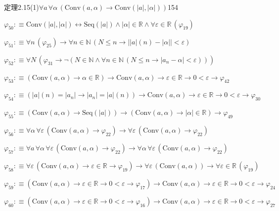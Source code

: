 \begin{fullproof}{定理2.15(1)}{$\forall a\,\forall \alpha\,(\mathrm{Conv}(a,\alpha) \to \mathrm{Conv}(\lvert a \rvert,\lvert \alpha \rvert))$}{154}
\begin{abbrevlist}
\item $\varphi_{50} :\equiv \mathrm{Conv}(\lvert a \rvert,\lvert \alpha \rvert) \leftrightarrow \mathrm{Seq}(\lvert a \rvert) \land \lvert \alpha \rvert \in \mathbb{R} \land \forall \varepsilon \in \mathbb{R}\,(\varphi_{19})$
\item $\varphi_{51} :\equiv \forall n\,(\varphi_{25}) \to \forall n \in \mathbb{N}\,(N \leq n \to \lvert \lvert a \rvert(n) - \lvert \alpha \rvert \rvert < \varepsilon)$
\item $\varphi_{52} :\equiv \forall N\,(\varphi_{31} \to \neg (N \in \mathbb{N} \land \forall n \in \mathbb{N}\,(N \leq n \to \lvert a_{n} - \alpha \rvert < \varepsilon)))$
\item $\varphi_{53} :\equiv (\mathrm{Conv}(a,\alpha) \to \alpha \in \mathbb{R}) \to \mathrm{Conv}(a,\alpha) \to \varepsilon \in \mathbb{R} \to 0 < \varepsilon \to \varphi_{42}$
\item $\varphi_{54} :\equiv (\lvert a \rvert(n) = \lvert a_{n} \rvert \to \lvert a_{n} \rvert = \lvert a \rvert(n)) \to \mathrm{Conv}(a,\alpha) \to \varepsilon \in \mathbb{R} \to 0 < \varepsilon \to \varphi_{30}$
\item $\varphi_{55} :\equiv (\mathrm{Conv}(a,\alpha) \to \mathrm{Seq}(\lvert a \rvert)) \to (\mathrm{Conv}(a,\alpha) \to \lvert \alpha \rvert \in \mathbb{R}) \to \varphi_{49}$
\item $\varphi_{56} :\equiv \forall \alpha\,\forall \varepsilon\,(\mathrm{Conv}(a,\alpha) \to \varphi_{22}) \to \forall \varepsilon\,(\mathrm{Conv}(a,\alpha) \to \varphi_{22})$
\item $\varphi_{57} :\equiv \forall a\,\forall \alpha\,\forall \varepsilon\,(\mathrm{Conv}(a,\alpha) \to \varphi_{22}) \to \forall \alpha\,\forall \varepsilon\,(\mathrm{Conv}(a,\alpha) \to \varphi_{22})$
\item $\varphi_{58} :\equiv \forall \varepsilon\,(\mathrm{Conv}(a,\alpha) \to \varepsilon \in \mathbb{R} \to \varphi_{19}) \to \forall \varepsilon\,(\mathrm{Conv}(a,\alpha)) \to \forall \varepsilon \in \mathbb{R}\,(\varphi_{19})$
\item $\varphi_{59} :\equiv (\mathrm{Conv}(a,\alpha) \to \varepsilon \in \mathbb{R} \to 0 < \varepsilon \to \varphi_{17}) \to \mathrm{Conv}(a,\alpha) \to \varepsilon \in \mathbb{R} \to 0 < \varepsilon \to \varphi_{24}$
\item $\varphi_{60} :\equiv (\mathrm{Conv}(a,\alpha) \to \varepsilon \in \mathbb{R} \to 0 < \varepsilon \to \varphi_{16}) \to \mathrm{Conv}(a,\alpha) \to \varepsilon \in \mathbb{R} \to 0 < \varepsilon \to \varphi_{27}$

\end{abbrevlist}
\end{fullproof}
